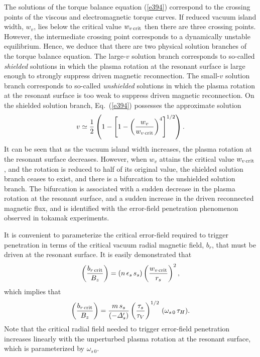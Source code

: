 \documentclass[12pt,prb,aps]{revtex4-1}
\begin{document}
The solutions of the torque balance equation (\ref{e394}) correspond to the crossing points of the viscous and electromagnetic torque
curves. If reduced vacuum island width, $w_v$, lies below
the critical value $w_{v\,{\rm crit}}$ then there are three crossing points. However, the intermediate crossing point corresponds to
a dynamically unstable equilibrium. Hence, we deduce that there are two physical solution branches of the torque
balance equation. The large-$v$ solution branch corresponds to  so-called {\em shielded}\/ solutions in which the plasma
rotation at the resonant surface is large enough to strongly suppress driven magnetic reconnection. The small-$v$
solution branch corresponds to so-called {\em unshielded}\/ solutions  in which the plasma rotation at the resonant surface is
too weak to suppress driven magnetic reconnection.\cite{rf1993,rf1998} 
On the shielded solution branch, Eq.~(\ref{e394}) possesses the approximate solution
\begin{equation}
v \simeq \frac{1}{2}\left(1-\left[1-\left(\frac{w_v}{w_{v\,{\rm crit}}}\right)^4\right]^{1/2}
\right).
\end{equation}
It can be seen that as the vacuum island width increases, the plasma rotation at the resonant surface decreases. However, when
$w_v$ attains the critical value $w_{v\,{\rm crit}}$, and the rotation is reduced to  half of its
original value, the shielded solution branch ceases to exist, and there is a bifurcation to the unshielded solution branch.\cite{rf1993,rf1998} The bifurcation is associated with a sudden decrease in the plasma rotation at the resonant surface, and a sudden
increase in the driven reconnected magnetic flux, and is identified with the error-field penetration phenomenon observed in tokamak
experiments. 

It is convenient to parameterize the critical error-field required to trigger  penetration in terms of the critical
vacuum radial magnetic field, $b_r$, that must be driven at the resonant surface. It is easily demonstrated that
\begin{equation}
\left(\frac{b_{r\,{\rm crit}}}{B_z}\right)= (n\,\epsilon_s\,s_s)\left(\frac{w_{v\,{\rm crit}}}{r_s}\right)^2,
\end{equation}
which implies that
\begin{equation}
\left(\frac{b_{r\,{\rm crit}}}{B_z}\right)= \frac{m\,s_s}{(-{\mit\Delta}_s')}\left(\frac{\tau_s}{\tau_V}\right)^{1/2}\,(\omega_{s\,0}\,\tau_H).
\end{equation}
Note that the critical radial field needed to trigger error-field
penetration increases linearly with the unperturbed plasma rotation at the resonant surface, which is parameterized by $\omega_{s\,0}$. 
\end{document}
